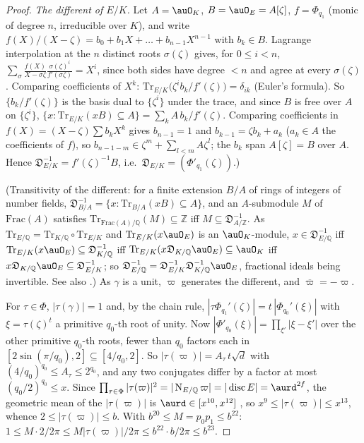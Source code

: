 \documentclass[10pt]{amsart}
\theoremstyle{definition}
\theoremstyle{remark}
\newcommand{\Z}{\mathbb Z}
\newcommand{\Q}{\mathbb Q}
\providecommand{\auPl}{\Phi}
\providecommand{\aubar}[1]{\overline{#1}}
\begin{document}
\begin{proof}
\emph{The different of $E/K$.} Let $A=\auO_K$, $B=\auO_E=A[\zeta]$, $f=\Phi_{q_1}$ (monic of degree
$n$, irreducible over $K$), and write $f(X)/(X-\zeta)=b_0+b_1X+\dots+b_{n-1}X^{n-1}$ with $b_k\in
B$. Lagrange interpolation at the $n$ distinct roots $\sigma(\zeta)$ gives, for $0\le i<n$,
$\sum_\sigma\frac{f(X)}{X-\sigma\zeta}\frac{\sigma(\zeta)^i}{f'(\sigma\zeta)}=X^i$, since both
sides have degree $<n$ and agree at every $\sigma(\zeta)$. Comparing coefficients of $X^k$:
$\mathrm{Tr}_{E/K}\bigl(\zeta^ib_k/f'(\zeta)\bigr)=\delta_{ik}$ (Euler's formula). So
$\{b_k/f'(\zeta)\}$ is the basis dual to $\{\zeta^i\}$ under the trace, and since $B$ is free over
$A$ on $\{\zeta^i\}$, $\{x:\mathrm{Tr}_{E/K}(xB)\subseteq A\}=\sum_kA\,b_k/f'(\zeta)$. Comparing
coefficients in $f(X)=(X-\zeta)\sum b_kX^k$ gives $b_{n-1}=1$ and $b_{k-1}=\zeta b_k+a_k$ ($a_k\in A$
the coefficients of $f$), so $b_{n-1-m}\in\zeta^m+\sum_{l<m}A\zeta^l$; the $b_k$ span $A[\zeta]=B$
over $A$. Hence $\mathfrak D_{E/K}^{-1}=f'(\zeta)^{-1}B$, i.e.\ $\mathfrak D_{E/K}=(\Phi'_{q_1}(\zeta))$.)

(Transitivity of the different: for a finite extension $B/A$ of rings of integers
of number fields, $\mathfrak D_{B/A}^{-1}=\{x:\mathrm{Tr}_{B/A}(xB)\subseteq A\}$, and an $A$-submodule $M$ of
$\mathrm{Frac}(A)$ satisfies $\mathrm{Tr}_{\mathrm{Frac}(A)/\Q}(M)\subseteq\Z$ iff $M\subseteq\mathfrak D_{A/\Z}^{-1}$. As
$\mathrm{Tr}_{E/\Q}=\mathrm{Tr}_{K/\Q}\circ\mathrm{Tr}_{E/K}$ and $\mathrm{Tr}_{E/K}(x\auO_E)$ is an
$\auO_K$-module, $x\in\mathfrak D_{E/\Q}^{-1}$ iff $\mathrm{Tr}_{E/K}(x\auO_E)\subseteq\mathfrak
D_{K/\Q}^{-1}$ iff $\mathrm{Tr}_{E/K}(x\mathfrak D_{K/\Q}\auO_E)\subseteq\auO_K$ iff $x\mathfrak
D_{K/\Q}\auO_E\subseteq\mathfrak D_{E/K}^{-1}$; so $\mathfrak D_{E/\Q}^{-1}=\mathfrak D_{E/K}^{-1}
\mathfrak D_{K/\Q}^{-1}\auO_E$, fractional ideals being invertible. See also \cite[Chapter~I, Proposition~(2.11), and Chapter~III, Propositions~(2.2) and~(2.4)]{Neukirch}.) As
$\gamma$ is a unit, $\varpi$ generates the different, and $\aubar\varpi=-\varpi$.

For $\tau\in\auPl$, $|\tau(\gamma)|=1$ and, by the chain rule, $|\tau\Phi_{q_1}'(\zeta)|=
t\,|\Phi_{q_0}'(\xi)|$ with $\xi=\tau(\zeta)^t$ a primitive $q_0$-th root of unity. Now
$|\Phi'_{q_0}(\xi)|=\prod_{\xi'}|\xi-\xi'|$ over the other primitive $q_0$-th roots, fewer than $q_0$
factors each in $[2\sin(\pi/q_0),2]\subseteq[4/q_0,2]$. So $|\tau(\varpi)|=A_\tau\,t\sqrt d$ with
$(4/q_0)^{q_0}\le A_\tau\le2^{q_0}$, and any two conjugates differ by a factor at most $(q_0/2)^{q_0}
\le x$. Since $\prod_{\tau\in\auPl}|\tau(\varpi)|^2=|\operatorname{N}_{E/\Q}\varpi|=|\operatorname{disc}
E|=\aurd^{2f}$, the geometric mean of the $|\tau(\varpi)|$ is $\aurd\in[x^{10},x^{12}]$
{\cite[(38)]{P46}}, so $x^9\le|\tau(\varpi)|\le x^{13}$, whence $2\le|\tau(\varpi)|\le b$. With $b^{20}
\le M=p_0p_1\le b^{22}$: $1\le M\cdot2/2\pi\le M|\tau(\varpi)|/2\pi\le b^{22}\cdot b/2\pi\le b^{23}$.
\end{proof}
\end{document}

